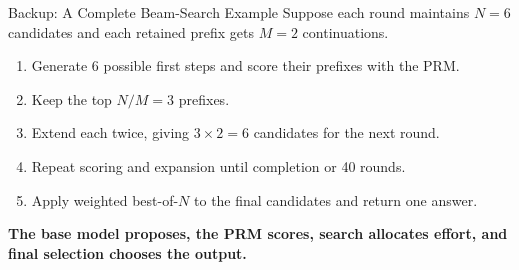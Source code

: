 \documentclass[aspectratio=1610,xcolor=dvipsnames,t]{beamer}
\newcommand{\keyterm}[1]{\textcolor{unirot}{\textbf{#1}}}
\begin{document}
\begin{frame}{Backup: A Complete Beam-Search Example}
  Suppose each round maintains $N=6$ candidates and each retained prefix gets $M=2$ continuations.
  \par\medskip
  \begin{enumerate}
    \item Generate 6 possible first steps and score their prefixes with the PRM.
    \item Keep the top $N/M=3$ prefixes.
    \item Extend each twice, giving $3\times2=6$ candidates for the next round.
    \item Repeat scoring and expansion until completion or 40 rounds.
    \item Apply weighted best-of-$N$ to the final candidates and return one answer.
  \end{enumerate}
  \par\medskip
  \keyterm{The base model proposes, the PRM scores, search allocates effort, and final selection chooses the output.}
\end{frame}
\end{document}
